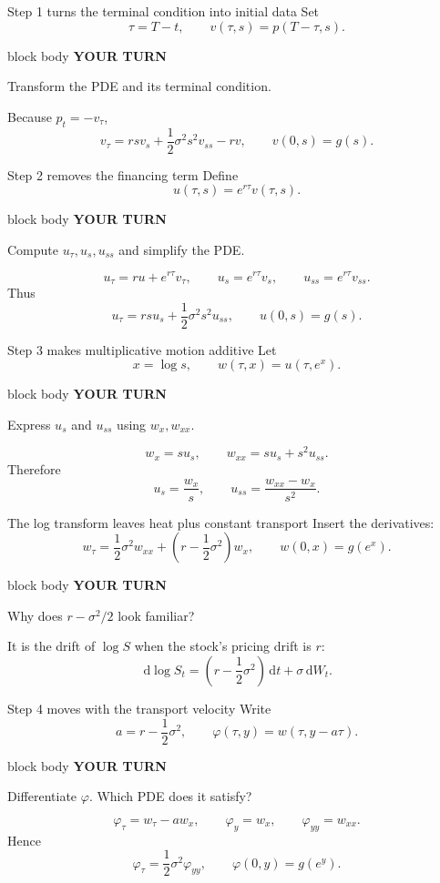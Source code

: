 \documentclass[handout,10pt,aspectratio=169]{beamer}
\newenvironment{pausebox}{%
  \begin{beamercolorbox}[rounded=true,sep=0.8em,wd=\textwidth]{block body}
  \textbf{\color{CourseGold}YOUR TURN}\quad
}{\end{beamercolorbox}}
\newcommand{\dd}{\,\mathrm d}
\newcommand{\1}{\mathbf 1}
\begin{document}
\begin{frame}{Step 1 turns the terminal condition into initial data}
Set
\[
\tau=T-t,
\qquad
v(\tau,s)=p(T-\tau,s).
\]
\begin{pausebox}
Transform the PDE and its terminal condition.
\end{pausebox}

Because \(p_t=-v_\tau\),
\[
\boxed{
v_\tau
=rsv_s+\frac12\sigma^2s^2v_{ss}-rv,
\qquad
v(0,s)=g(s).}
\]
\end{frame}

\begin{frame}{Step 2 removes the financing term}
Define
\[
u(\tau,s)=e^{r\tau}v(\tau,s).
\]
\begin{pausebox}
Compute \(u_\tau,u_s,u_{ss}\) and simplify the PDE.
\end{pausebox}

\[
u_\tau=ru+e^{r\tau}v_\tau,
\qquad
u_s=e^{r\tau}v_s,
\qquad
u_{ss}=e^{r\tau}v_{ss}.
\]
Thus
\[
\boxed{
u_\tau=rsu_s+\frac12\sigma^2s^2u_{ss},
\qquad u(0,s)=g(s).}
\]
\end{frame}

\begin{frame}{Step 3 makes multiplicative motion additive}
Let
\[
x=\log s,
\qquad
w(\tau,x)=u(\tau,e^x).
\]
\begin{pausebox}
Express \(u_s\) and \(u_{ss}\) using \(w_x,w_{xx}\).
\end{pausebox}

\[
w_x=su_s,
\qquad
w_{xx}=su_s+s^2u_{ss}.
\]
Therefore
\[
\boxed{
u_s=\frac{w_x}{s},
\qquad
u_{ss}=\frac{w_{xx}-w_x}{s^2}.}
\]
\end{frame}

\begin{frame}{The log transform leaves heat plus constant transport}
Insert the derivatives:
\[
\boxed{
w_\tau
=\frac12\sigma^2w_{xx}
+\left(r-\frac12\sigma^2\right)w_x,
\qquad
w(0,x)=g(e^x).}
\]
\begin{pausebox}
Why does \(r-\sigma^2/2\) look familiar?
\end{pausebox}

It is the drift of \(\log S\) when the stock's pricing drift is \(r\):
\[
\dd\log S_t
=\left(r-\frac12\sigma^2\right)\dd t+\sigma\dd W_t.
\]
\end{frame}

\begin{frame}{Step 4 moves with the transport velocity}
Write
\[
a=r-\frac12\sigma^2,
\qquad
\varphi(\tau,y)=w(\tau,y-a\tau).
\]
\begin{pausebox}
Differentiate \(\varphi\). Which PDE does it satisfy?
\end{pausebox}

\[
\varphi_\tau=w_\tau-aw_x,
\qquad
\varphi_y=w_x,
\qquad
\varphi_{yy}=w_{xx}.
\]
Hence
\[
\boxed{
\varphi_\tau=\frac12\sigma^2\varphi_{yy},
\qquad
\varphi(0,y)=g(e^y).}
\]
\end{frame}
\end{document}
